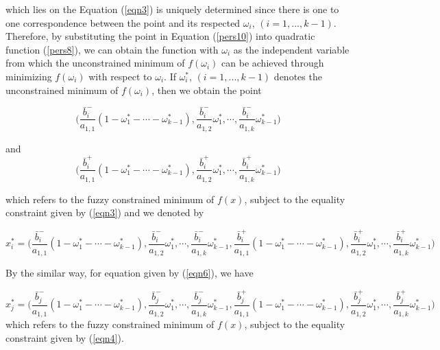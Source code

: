 \documentclass{iaesarticle3}
\begin{document}
\noindent which lies on the Equation (\ref{eqn3}) is uniquely determined since there is one to one correspondence between the point and its respected $\omega_i$, $(i=1,...,k-1)$. Therefore, by substituting the point in Equation (\ref{pers10}) into quadratic function (\ref{pers8}), we can obtain the function with $\omega_i$ as the independent variable from which the unconstrained minimum of $f(\omega_i)$ can be achieved through minimizing $f(\omega_i)$ with respect to $\omega_i$. If $\omega_i^*$, $(i=1,...,k-1)$ denotes the unconstrained minimum of $f(\omega_i)$, then we obtain the point

\begin{equation}\label{pers11a}
    \bigg(\frac{\bar{b}_i^-}{a_{1,1}}(1 - \omega_1^* - \cdots - \omega_{k-1}^*), \frac{\bar{b}_i^-}{a_{1,2}}\omega_1^*, \cdots, \frac{\bar{b}_i^-}{a_{1,k}}\omega_{k-1}^*\bigg)
\end{equation}

\noindent and
\begin{equation}\label{pers11a}
    \bigg(\frac{\bar{b}_i^+}{a_{1,1}}(1 - \omega_1^* - \cdots - \omega_{k-1}^*), \frac{\bar{b}_i^+}{a_{1,2}}\omega_1^*, \cdots, \frac{\bar{b}_i^+}{a_{1,k}}\omega_{k-1}^*\bigg)
\end{equation}

\noindent which refers to the fuzzy constrained minimum of $f(x)$, subject to the equality constraint given by (\ref{eqn3}) and we denoted by

\begin{equation}\label{11c}
    x_i^* = \bigg(\frac{\bar{b}_i^-}{a_{1,1}}(1 - \omega_1^* - \cdots - \omega_{k-1}^*), \frac{\bar{b}_i^-}{a_{1,2}}\omega_1^*, \cdots, \frac{\bar{b}_i^-}{a_{1,k}}\omega_{k-1}^*, \frac{\bar{b}_i^+}{a_{1,1}}(1 - \omega_1^* - \cdots - \omega_{k-1}^*), \frac{\bar{b}_i^+}{a_{1,2}}\omega_1^*, \cdots, \frac{\bar{b}_i^+}{a_{1,k}}\omega_{k-1}^*\bigg)
\end{equation}

By the similar way, for equation given by (\ref{eqn6}), we have

\begin{equation}\label{11d}
    x_j^* = \bigg(\frac{\bar{b}_j^-}{a_{1,1}}(1 - \omega_1^* - \cdots - \omega_{k-1}^*), \frac{\bar{b}_j^-}{a_{1,2}}\omega_1^*, \cdots, \frac{\bar{b}_j^-}{a_{1,k}}\omega_{k-1}^*, \frac{\bar{b}_j^+}{a_{1,1}}(1 - \omega_1^* - \cdots - \omega_{k-1}^*), \frac{\bar{b}_j^+}{a_{1,2}}\omega_1^*, \cdots, \frac{\bar{b}_j^+}{a_{1,k}}\omega_{k-1}^*\bigg)
\end{equation}
\noindent 
which refers to the fuzzy constrained minimum of $f(x)$, subject to the equality constraint given by (\ref{eqn4}).
\end{document}
